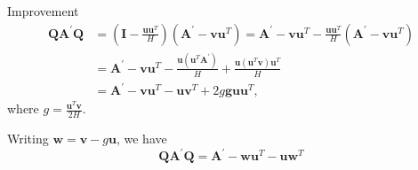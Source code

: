 \documentclass{beamer}
\begin{document}
\begin{frame}{Improvement}
    \begin{align*}
        \mathbf{Q} \mathbf{A}^{\prime} \mathbf{Q} & =\left(\mathbf{I}-\frac{\mathbf{u} \mathbf{u}^T}{H}\right)\left(\mathbf{A}^{\prime}-\mathbf{v} \mathbf{u}^T\right)=\mathbf{A}^{\prime}-\mathbf{v} \mathbf{u}^T-\frac{\mathbf{u} \mathbf{u}^T}{H}\left(\mathbf{A}^{\prime}-\mathbf{v} \mathbf{u}^T\right) \\
        & =\mathbf{A}^{\prime}-\mathbf{v} \mathbf{u}^T-\frac{\mathbf{u}\left(\mathbf{u}^T \mathbf{A}^{\prime}\right)}{H}+\frac{\mathbf{u}\left(\mathbf{u}^T \mathbf{v}\right) \mathbf{u}^T}{H} \\
        & =\mathbf{A}^{\prime}-\mathbf{v} \mathbf{u}^T-\mathbf{u} \mathbf{v}^T+2 g \mathbf{g u} \mathbf{u}^T,
    \end{align*}
    where $g=\frac{\mathbf{u}^T \mathbf{v}}{2 H}$.
    \vspace{1cm}
        
         Writing $\mathbf{w}=\mathbf{v}-g \mathbf{u}$, we have
        \[
        \mathbf{Q A}^\prime \mathbf{Q}=\mathbf{A}^{\prime}-\mathbf{w} \mathbf{u}^T-\mathbf{u} \mathbf{w}^T
        \]
 
\end{frame}
\end{document}
